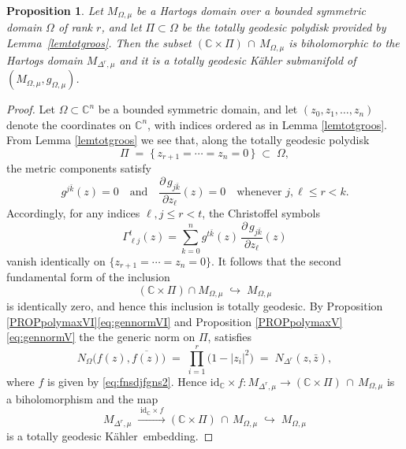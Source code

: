 \documentclass[reqno, 11pt]{amsart}
\newtheorem{prop}[theor]{Proposition}
\newcommand{\C}{\mathbb{C}}
\newcommand{\W}{\Omega}
\newcommand{\K}{K\"ahler}
\begin{document}
\begin{prop}\label{PROPPolyDisk1}
Let $M_{\Omega,\mu}$ be a Hartogs domain over a  bounded symmetric domain $\Omega$ of rank $r$, and let 
$\Pi\subset\Omega$
be the totally geodesic polydisk provided by Lemma~\ref{lemtotgroos}.  Then the subset
$(\C\times\Pi)\,\cap\,M_{\Omega,\mu}$ is biholomorphic to the Hartogs domain $M_{\Delta^r,\mu}$ and it is a totally geodesic Kähler submanifold of $(M_{\Omega,\mu},g_{{\Omega,\mu}})$.
\end{prop}


\begin{proof}
Let $\W\subset\C^n$ be a bounded symmetric  domain, and let $(z_0,z_1,\dots,z_n)$ denote the coordinates on $\C^n$, with indices ordered as in Lemma \ref{lemtotgroos}. From Lemma \ref{lemtotgroos} we see that, along the totally geodesic polydisk
$$
\Pi \;=\;\{\,z_{r+1}=\cdots=z_n=0\,\}\;\subset\;\W,
$$
the metric components satisfy
$$
g^{j\bar k}(z)=0
\quad\text{and}\quad
\frac{\partial\,g_{j\bar k}}{\partial z_\ell}(z)=0
\quad
\text{whenever } j,\ell\le r<k.
$$
Accordingly, for any indices $\ell,j\le r<t$, the Christoffel symbols
$$
\Gamma_{\ell j}^t(z)
=\sum_{k=0}^n g^{t\bar k}(z)\,\frac{\partial\,g_{j\bar k}}{\partial z_\ell}(z)
$$
vanish identically on $\{z_{r+1}=\cdots=z_n=0\}$.  It follows that the second fundamental form of the inclusion
$$
(\C\times\Pi)\cap M_{\Omega,\mu}\;\hookrightarrow\;M_{\Omega,\mu}
$$
is identically zero, and hence this inclusion is totally geodesic.
By  Proposition \ref{PROPpolymaxVI}\eqref{eq:gennormVI} and Proposition \ref{PROPpolymaxV}\eqref{eq:gennormV}
the  the generic norm on \(\Pi\), satisfies
\[
N_{\Omega}\bigl(f(z),\overline{f(z)}\bigr)
\;=\;\prod_{i=1}^r \bigl(1 - |z_i|^2\bigr)
\;=\;N_{\Delta^r}(z,\bar z),
\]
where $f$ is given by \eqref{eq:fnsdjfgns2}.
Hence $\mathrm{id}_{\C}\times f: M_{\Delta^r,\mu}\rightarrow  (\C\times\Pi)\,\cap\,M_{\Omega,\mu}$
is a biholomorphism and the map  
\[
M_{\Delta^r,\mu}
\;\xrightarrow{\;\mathrm{id}_{\C}\times f\;}
(\C\times\Pi)\,\cap\,M_{\Omega,\mu}
\;\hookrightarrow\;M_{\Omega,\mu}
\]
is a totally geodesic \K\ embedding.
\end{proof}
\end{document}
